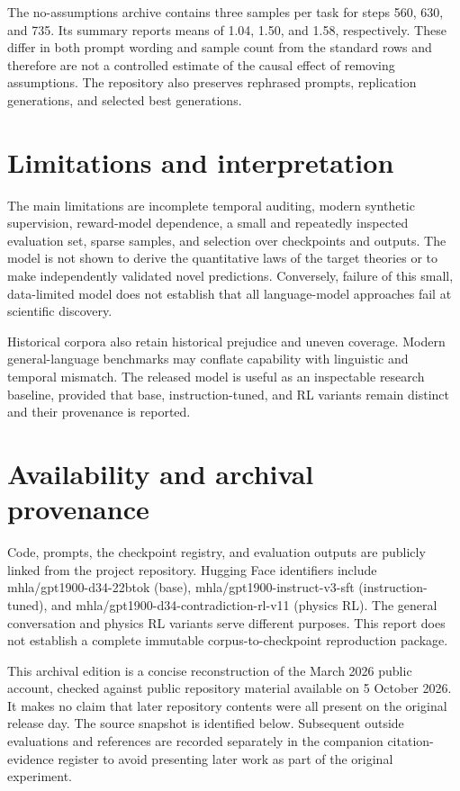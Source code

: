 \documentclass[10pt,a4paper]{article}
\begin{document}
The no-assumptions archive contains three samples per task for steps 560, 630, and 735. Its summary reports means of 1.04, 1.50, and 1.58, respectively. These differ in both prompt wording and sample count from the standard rows and therefore are not a controlled estimate of the causal effect of removing assumptions. The repository also preserves rephrased prompts, replication generations, and selected best generations. \cite{ref5}

\section{Limitations and interpretation}
The main limitations are incomplete temporal auditing, modern synthetic supervision, reward-model dependence, a small and repeatedly inspected evaluation set, sparse samples, and selection over checkpoints and outputs. The model is not shown to derive the quantitative laws of the target theories or to make independently validated novel predictions. Conversely, failure of this small, data-limited model does not establish that all language-model approaches fail at scientific discovery.

Historical corpora also retain historical prejudice and uneven coverage. Modern general-language benchmarks may conflate capability with linguistic and temporal mismatch. The released model is useful as an inspectable research baseline, provided that base, instruction-tuned, and RL variants remain distinct and their provenance is reported. \cite{ref1,ref2}

\section{Availability and archival provenance}
Code, prompts, the checkpoint registry, and evaluation outputs are publicly linked from the project repository. Hugging Face identifiers include mhla/gpt1900-d34-22btok (base), mhla/gpt1900-instruct-v3-sft (instruction-tuned), and mhla/gpt1900-d34-contradiction-rl-v11 (physics RL). The general conversation and physics RL variants serve different purposes. This report does not establish a complete immutable corpus-to-checkpoint reproduction package. \cite{ref2,ref4,ref6}

This archival edition is a concise reconstruction of the March 2026 public account, checked against public repository material available on 5 October 2026. It makes no claim that later repository contents were all present on the original release day. The source snapshot is identified below. Subsequent outside evaluations and references are recorded separately in the companion citation-evidence register to avoid presenting later work as part of the original experiment.
\end{document}
